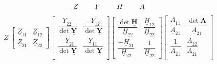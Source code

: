 \begingroup
\arraycolsep=1.0pt
\begin{align*}
    Z && \hspace{0.5cm} Y && \hspace{0.5cm} H && \hspace{0.5cm} A
\end{align*}
\[
    Z\
    \begin{bmatrix}
        \underline{Z}_{11} & \underline{Z}_{12}\\
        \underline{Z}_{21} & \underline{Z}_{22}
    \end{bmatrix}
    \begin{bmatrix}
        \dfrac{\underline{Y}_{22}}{\operatorname{det}\underline{\boldsymbol{Y}}} & \dfrac{-\underline{Y}_{12}}{\operatorname{det} \underline{\boldsymbol{Y}}}\\
        \dfrac{-\underline{Y}_{21}}{\operatorname{det} \underline{\boldsymbol{Y}}} & \dfrac{\underline{{Y}}_{11}}{\operatorname{det} \underline{\boldsymbol{Y}}} \\
    \end{bmatrix}
    \begin{bmatrix}
        \dfrac{\operatorname{det}\underline{\boldsymbol{{H}}}}{\underline{H}_{22}} & \dfrac{\underline{H}_{12}}{\underline{H}_{22}} \\
        \dfrac{-\underline{H}_{21}}{\underline{H}_{22}} & \dfrac{1}{\underline{H}_{22}}
    \end{bmatrix}
    \begin{bmatrix}
        \dfrac{\underline{A}_{11}}{\underline{A}_{21}} & \dfrac{\operatorname{det}\underline{\boldsymbol{A}}}{\underline{A}_{21}}\\
        \dfrac{1}{\underline{A}_{21}} & \dfrac{\underline{{A}}_{22}}{\underline{A}_{21}} \\
    \end{bmatrix}
\]
